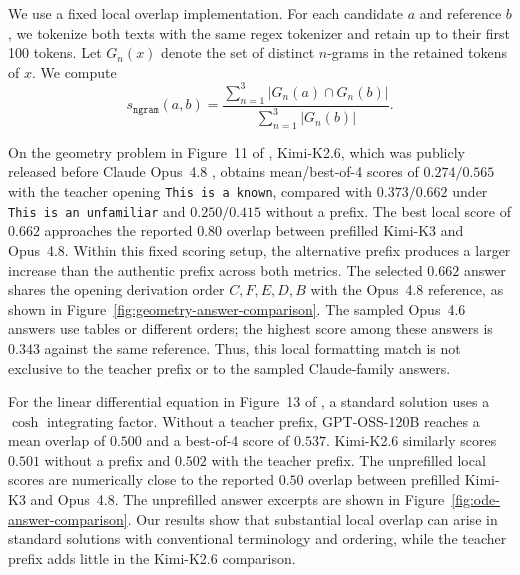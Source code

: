 We use a fixed local overlap implementation. For each candidate $a$ and
reference $b$, we tokenize both texts with the same regex tokenizer and
retain up to their first 100 tokens. Let $G_n(x)$ denote the set of distinct
$n$-grams in the retained tokens of $x$. We compute
\begin{equation}
    s_{\mathtt{ngram}}(a,b)
    =
    \frac{\sum_{n=1}^{3}|G_n(a)\cap G_n(b)|}
         {\sum_{n=1}^{3}|G_n(b)|}.
    \label{eq:local-ngram-proxy}
\end{equation}

On the geometry problem in Figure~11 of \citet{panfilov2026stealing},
Kimi-K2.6, which was publicly released before Claude Opus~4.8
\citep{team2025kimi,anthropic2026opus48},
obtains mean/best-of-4 scores of $0.274/0.565$ with the
teacher opening \texttt{This is a known}, compared with $0.373/0.662$
under \texttt{This is an unfamiliar} and $0.250/0.415$ without a prefix.
The best local score of $0.662$ approaches the reported $0.80$ overlap
between prefilled Kimi-K3 and Opus~4.8.
Within this fixed scoring setup, the alternative prefix produces a larger
increase than the authentic prefix across both metrics.
The selected $0.662$ answer shares the opening derivation order $C,F,E,D,B$
with the Opus~4.8 reference, as shown in Figure~\ref{fig:geometry-answer-comparison}.
The sampled Opus~4.6 answers use tables or
different orders; the highest score among these answers is $0.343$ against the
same reference. Thus, this local formatting match is not exclusive to the
teacher prefix or to the sampled Claude-family answers.

For the linear differential equation in Figure~13 of
\citet{panfilov2026stealing}, a standard solution uses a $\cosh$ integrating
factor. Without a teacher prefix,
GPT-OSS-120B reaches a mean overlap of $0.500$ and a best-of-4 score of
$0.537$. Kimi-K2.6 similarly scores $0.501$ without a prefix and $0.502$
with the teacher prefix. The unprefilled local scores are numerically close
to the reported $0.50$ overlap between prefilled Kimi-K3 and Opus~4.8.
The unprefilled answer excerpts are shown in Figure~\ref{fig:ode-answer-comparison}.
Our results show that substantial local overlap can arise in standard
solutions with conventional terminology and ordering, while the teacher
prefix adds little in the Kimi-K2.6 comparison.

